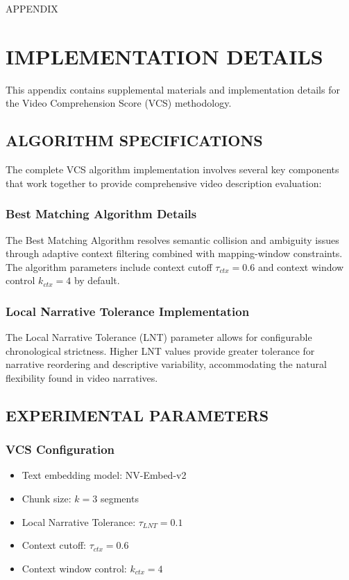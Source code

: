 \documentclass[main.tex]{subfiles}
\begin{document}
\newpage

\appendix
\label{appendix}
\begin{center}
APPENDIX\\
\end{center}

\section{IMPLEMENTATION DETAILS}
\label{app:implementation}

This appendix contains supplemental materials and implementation details for the Video Comprehension Score (VCS) methodology.

\subsection{ALGORITHM SPECIFICATIONS}

The complete VCS algorithm implementation involves several key components that work together to provide comprehensive video description evaluation:

\subsubsection{Best Matching Algorithm Details}
The Best Matching Algorithm resolves semantic collision and ambiguity issues through adaptive context filtering combined with mapping-window constraints. The algorithm parameters include context cutoff $\tau_{ctx} = 0.6$ and context window control $k_{ctx} = 4$ by default.

\subsubsection{Local Narrative Tolerance Implementation}
The Local Narrative Tolerance (LNT) parameter allows for configurable chronological strictness. Higher LNT values provide greater tolerance for narrative reordering and descriptive variability, accommodating the natural flexibility found in video narratives.

\subsection{EXPERIMENTAL PARAMETERS}

\subsubsection{VCS Configuration}
\begin{itemize}
\item Text embedding model: NV-Embed-v2
\item Chunk size: $k = 3$ segments
\item Local Narrative Tolerance: $\tau_{LNT} = 0.1$
\item Context cutoff: $\tau_{ctx} = 0.6$
\item Context window control: $k_{ctx} = 4$
\end{itemize}
\end{document}
